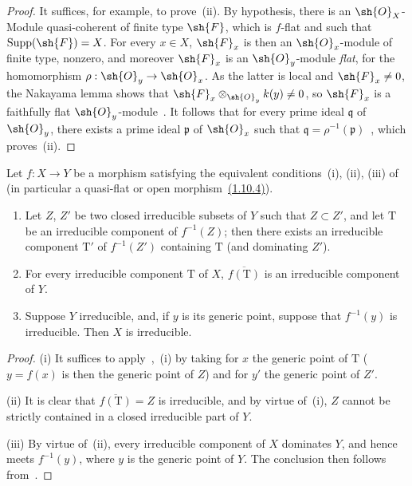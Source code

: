 \begin{proof}
It suffices, for example, to prove~(ii).
By hypothesis, there is an $\sh{O}_X$-Module quasi-coherent of finite type $\sh{F}$, which is $f$-flat and such that $\operatorname{Supp}(\sh{F})=X$.
For every $x\in X$, $\sh{F}_x$ is then an $\sh{O}_x$-module of finite type, nonzero, and moreover $\sh{F}_x$ is an $\sh{O}_y$-module \emph{flat}, for the homomorphism $\rho:\sh{O}_y\to\sh{O}_x$.
As the latter is local and $\sh{F}_x\neq 0$, the Nakayama lemma shows that $\sh{F}_x\otimes_{\sh{O}_y}k(y)\neq 0$, so $\sh{F}_x$ is a faithfully flat $\sh{O}_y$-module~.
It follows that for every prime ideal $\mathfrak{q}$ of $\sh{O}_y$, there exists a prime ideal $\mathfrak{p}$ of $\sh{O}_x$ such that $\mathfrak{q}=\rho^{-1}(\mathfrak{p})$~, which proves~(ii).
\end{proof}

\begin{corollary}[2.3.5]
\label{IV.2.3.5}
Let $f:X\to Y$ be a morphism satisfying the equivalent conditions~(i), (ii), (iii) of~ \textnormal{(}in particular a quasi-flat or open morphism~{\hyperlink{ega4.c04.cor.1-10-4}{(1.10.4)}}\textnormal{)}.
\begin{enumerate}
  \item[(i)] Let $Z$, $Z'$ be two closed irreducible subsets of $Y$ such that $Z\subset Z'$, and let $\mathrm{T}$ be an irreducible component of $f^{-1}(Z)$; then there exists an irreducible component $\mathrm{T}'$ of $f^{-1}(Z')$ containing $\mathrm{T}$ \textnormal{(}and dominating $Z'$\textnormal{)}.
  \item[(ii)] For every irreducible component $\mathrm{T}$ of $X$, $\overline{f(\mathrm{T})}$ is an irreducible component of $Y$.
  \item[(iii)] Suppose $Y$ irreducible, and, if $y$ is its generic point, suppose that $f^{-1}(y)$ is irreducible. Then $X$ is irreducible.
\end{enumerate}
\end{corollary}

\begin{proof}
(i) It suffices to apply~,~(i) by taking for $x$ the generic point of $\mathrm{T}$ ($y=f(x)$ is then the generic point of $Z$) and for $y'$ the generic point of $Z'$.

(ii) It is clear that $\overline{f(\mathrm{T})}=Z$ is irreducible, and by virtue of~(i), $Z$ cannot be strictly contained in a closed irreducible part of $Y$.

(iii) By virtue of~(ii), every irreducible component of $X$ dominates $Y$, and hence meets $f^{-1}(y)$, where $y$ is the generic point of $Y$.
The conclusion then follows from~.
\end{proof}

